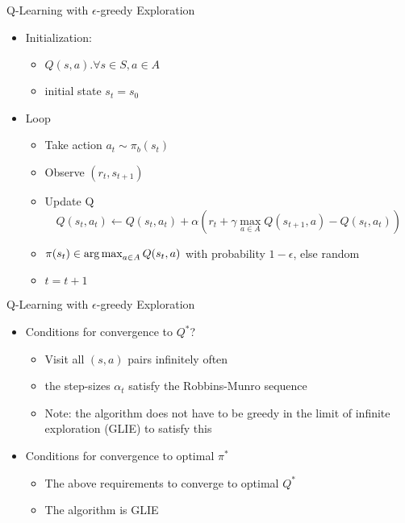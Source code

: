 \begin{frame}[c]{Q-Learning with $\epsilon$-greedy Exploration}
	
	\begin{itemize}
		\item Initialization:
		\begin{itemize}
			\item $Q(s,a). \forall s \in S, a \in A$ 
			\item initial state $s_t = s_0$
		\end{itemize} 
		\item Loop
		\begin{itemize}
			\item Take action $a_{t} \sim \pi_b(s_{t})$ 
			\item Observe $(r_{t}, s_{t+1})$
			\item Update Q 
			$$Q(s_t,a_t) \gets Q(s_t, a_t) + \alpha (r_t + \gamma \max_{a\in A} Q(s_{t+1}, a) - Q(s_t, a_t))$$
			\item $\pi(s_t) \in \operatorname*{arg\,max}_{a\in A} Q(s_t, a)$ with probability $1-\epsilon$, else random
			\item $t = t+1$
		\end{itemize} 
	\end{itemize}
	
\end{frame}
\begin{frame}[c]{Q-Learning with $\epsilon$-greedy Exploration}
	
	\begin{itemize}
		\item Conditions for convergence to $Q^*$?
		\begin{itemize}
			\item Visit all $(s, a)$ pairs infinitely often
			\item the step-sizes $\alpha_t$ satisfy the Robbins-Munro sequence
			\item Note: the algorithm does not have to be greedy in the limit of infinite exploration (GLIE) to satisfy this
		\end{itemize}
		\bigskip
		\item Conditions for convergence to optimal $\pi^*$
		\begin{itemize}
			\item The above requirements to converge to optimal $Q^*$
			\item The algorithm is GLIE
		\end{itemize}
	\end{itemize}
	
\end{frame}

